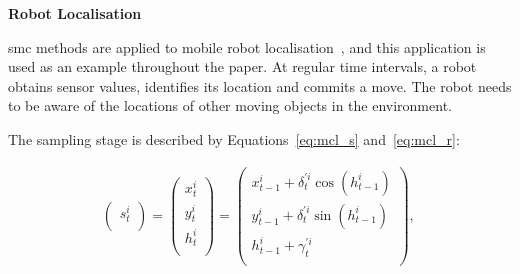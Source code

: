 



\textbf{Robot Localisation}

\gls{smc} methods are applied to mobile robot localisation~\cite{chau14trets,montemerlo02},
and this application is used as an example throughout the paper.
At regular time intervals, a robot obtains sensor values, identifies its location and commits a move.
The robot needs to be aware of the locations of other moving objects in the environment.

The sampling stage is described by Equations~\ref{eq:mcl_s} and~\ref{eq:mcl_r}:

\begin{equation}
\begin{aligned}
  \begin{pmatrix}
    s^i_{t}    \\ 
  \end{pmatrix}
  =
  \begin{pmatrix}
    x^i_{t}    \\ 
    y^i_{t}    \\ 
    h^i_{t}    \\ 
  \end{pmatrix}
  =
  \begin{pmatrix}
  	x^i_{t-1} + \delta^{'i}_{t} \cos(h^i_{t-1}) \\
		y^i_{t-1} + \delta^{'i}_{t} \sin(h^i_{t-1}) \\
		h^i_{t-1} + \gamma^{'i}_{t} \\
  \end{pmatrix}
	\mbox{, }
\end{aligned}
\label{eq:mcl_s}
\end{equation}


